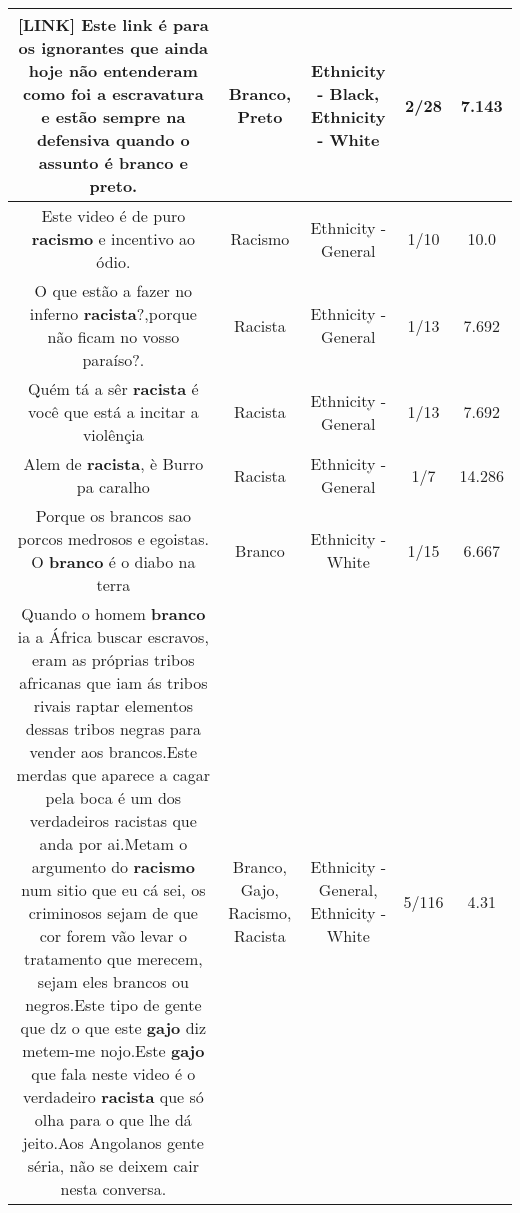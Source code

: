 \documentclass[11pt]{article}
\newlength\mylength
\begin{document}
\begin{center}
\begin{longtable}{|C{.65\mylength}|C{.30\mylength}|C{.12\mylength}|C{.12\mylength}|C{.12\mylength}|}
  \small  [LINK] Este link é para os ignorantes que ainda hoje não entenderam como foi a escravatura e estão sempre na defensiva quando o assunto é \textbf{branco} e \textbf{preto}.\normalsize   & Branco, Preto & Ethnicity - Black, Ethnicity - White & 2/28 & 7.143 \\  \hline
  \small Este video é de puro \textbf{racismo} e incentivo ao ódio.\normalsize   & Racismo & Ethnicity - General & 1/10 & 10.0 \\  \hline
  \small O que estão a fazer no inferno \textbf{racista}?,porque não ficam no vosso paraíso?.\normalsize   & Racista & Ethnicity - General & 1/13 & 7.692 \\  \hline
  \small Quém tá a sêr \textbf{racista} é você que está a incitar a violênçia\normalsize   & Racista & Ethnicity - General & 1/13 & 7.692 \\  \hline
  \small Alem de \textbf{racista}, è Burro pa caralho\normalsize   & Racista & Ethnicity - General & 1/7 & 14.286 \\  \hline
  \small Porque os brancos sao porcos medrosos e egoistas. O \textbf{branco} é o diabo na terra\normalsize   & Branco & Ethnicity - White & 1/15 & 6.667 \\  \hline
  \small Quando o homem \textbf{branco} ia a África buscar escravos, eram as próprias tribos africanas que iam ás tribos rivais  raptar elementos dessas tribos negras para vender aos brancos.Este merdas que aparece a cagar pela boca é um dos verdadeiros racistas que anda por ai.Metam o argumento do \textbf{racismo} num sitio que eu cá sei, os criminosos sejam de que cor forem vão levar o tratamento que merecem, sejam eles brancos ou negros.Este tipo de gente que dz o que este \textbf{gajo} diz metem-me nojo.Este \textbf{gajo} que fala neste video é o verdadeiro \textbf{racista} que só olha para o que lhe dá jeito.Aos Angolanos gente séria, não se deixem cair nesta conversa.\normalsize   & Branco, Gajo, Racismo, Racista & Ethnicity - General, Ethnicity - White & 5/116 & 4.31 \\  \hline

\end{longtable}
\end{center}
\end{document}
